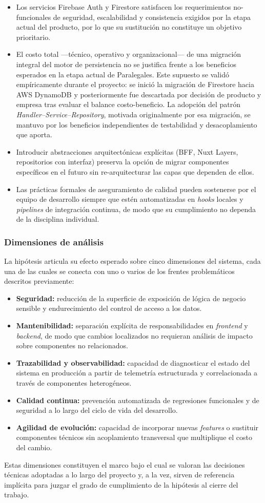 \begin{itemize}
  \item Los servicios Firebase Auth y Firestore satisfacen los requerimientos no-funcionales de seguridad, escalabilidad y consistencia exigidos por la etapa actual del producto, por lo que su sustitución no constituye un objetivo prioritario.
  \item El costo total —técnico, operativo y organizacional— de una migración integral del motor de persistencia no se justifica frente a los beneficios esperados en la etapa actual de Paralegales. Este supuesto se validó empíricamente durante el proyecto: se inició la migración de Firestore hacia AWS DynamoDB y posteriormente fue descartada por decisión de producto y empresa tras evaluar el balance costo-beneficio. La adopción del patrón \textit{Handler--Service--Repository}, motivada originalmente por esa migración, se mantuvo por los beneficios independientes de testabilidad y desacoplamiento que aporta.
  \item Introducir abstracciones arquitectónicas explícitas (BFF, Nuxt Layers, repositorios con interfaz) preserva la opción de migrar componentes específicos en el futuro sin re-arquitecturar las capas que dependen de ellos.
  \item Las prácticas formales de aseguramiento de calidad pueden sostenerse por el equipo de desarrollo siempre que estén automatizadas en \textit{hooks} locales y \textit{pipelines} de integración continua, de modo que su cumplimiento no dependa de la disciplina individual.
\end{itemize}

\subsubsection*{Dimensiones de análisis}

La hipótesis articula su efecto esperado sobre cinco dimensiones del sistema, cada una de las cuales se conecta con uno o varios de los frentes problemáticos descritos previamente:

\begin{itemize}
  \item \textbf{Seguridad:} reducción de la superficie de exposición de lógica de negocio sensible y endurecimiento del control de acceso a los datos.
  \item \textbf{Mantenibilidad:} separación explícita de responsabilidades en \textit{frontend} y \textit{backend}, de modo que cambios localizados no requieran análisis de impacto sobre componentes no relacionados.
  \item \textbf{Trazabilidad y observabilidad:} capacidad de diagnosticar el estado del sistema en producción a partir de telemetría estructurada y correlacionada a través de componentes heterogéneos.
  \item \textbf{Calidad continua:} prevención automatizada de regresiones funcionales y de seguridad a lo largo del ciclo de vida del desarrollo.
  \item \textbf{Agilidad de evolución:} capacidad de incorporar nuevas \textit{features} o sustituir componentes técnicos sin acoplamiento transversal que multiplique el costo del cambio.
\end{itemize}

Estas dimensiones constituyen el marco bajo el cual se valoran las decisiones técnicas adoptadas a lo largo del proyecto y, a la vez, sirven de referencia implícita para juzgar el grado de cumplimiento de la hipótesis al cierre del trabajo.
